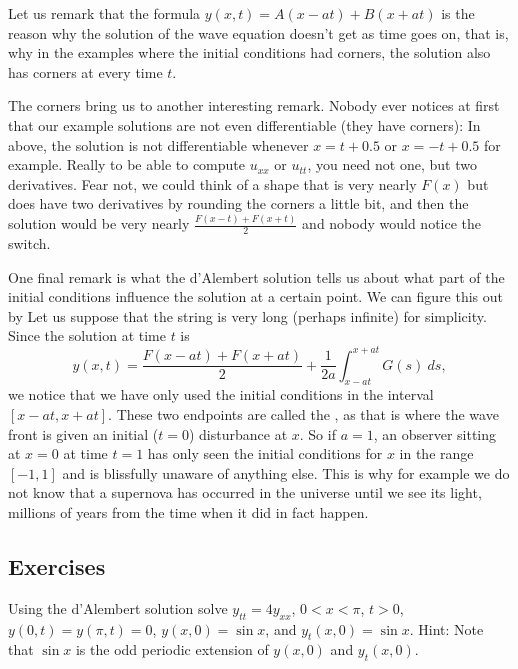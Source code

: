Let us remark that the formula $y(x,t) = A(x-at) + B(x+at)$ is the reason
why the solution of the wave equation doesn't get  as time
goes on, that is, why in the examples where the initial conditions
had corners, the solution also has corners at every time $t$.

\medskip

The corners bring us to another interesting remark.  Nobody ever notices at first
that our example solutions are not even differentiable (they have corners):
In  above, the solution is not
differentiable whenever $x=t+0.5$ or $x=-t+0.5$ for example.
Really to be able to compute $u_{xx}$ or $u_{tt}$, you need not one, but two
derivatives.  Fear not, we could think of a shape that is very nearly
$F(x)$ but does have two derivatives by rounding the corners a little bit,
and then the solution would be very nearly
$\frac{F(x-t)+F(x+t)}{2}$ and nobody would notice the switch.

\medskip

One final remark is what the d'Alembert solution tells us about what
part of the initial conditions influence the solution at a certain point.
We can figure this out by   Let us suppose that the string is very long (perhaps
infinite) for simplicity.  Since the solution at time $t$ is
\begin{equation*}
y(x,t) =
\frac{F(x-at) + F(x+at)}{2} + \frac{1}{2a} \int_{x-at}^{x+at} G(s) ~ds ,
\end{equation*}
we notice that we have only used the initial conditions in the interval
$[x-at,x+at]$.  These two endpoints are called the
\emph{}, as that is where the wave front is given an
initial ($t=0$) disturbance at $x$.
So if $a=1$, an observer sitting at $x=0$ at time $t=1$ has only seen the
initial conditions for $x$ in the range $[-1,1]$
and is blissfully unaware of anything else.
This is why for example we do not know that a supernova has occurred in the
universe until we see its light, millions of years from the time
when it did in fact happen.

\subsection{Exercises}

\begin{exercise}
Using the d'Alembert solution solve $y_{tt} = 4y_{xx}$, $0 < x < \pi$, $t >
0$,
$y(0,t) = y(\pi, t) = 0$, $y(x,0) = \sin x$, and
$y_t(x,0) = \sin x$.  Hint: Note that $\sin x$ is the odd periodic extension of
$y(x,0)$ and $y_t(x,0)$.
\end{exercise}


